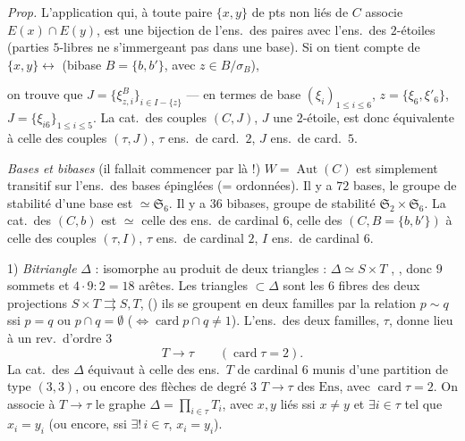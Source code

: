 \documentclass[11pt,a4paper]{article}
\begin{document}
\emph{Prop.} L'application qui, à toute paire $\lbrace x,y\rbrace$ de pts non liés de $C$ associe $E(x)\cap E(y)$, est une bijection de l'ens.\ des paires avec l'ens.\ des $2$-étoiles (parties $5$-libres ne s'immergeant pas dans une base). Si on tient compte de $\lbrace x,y\rbrace\leftrightarrow$ (bibase $B=\lbrace b,b'\rbrace$, avec $z\in B/\sigma_B$),

on trouve que $J=\lbrace\xi^B_{z,i}\rbrace_{i\in I-\lbrace z\rbrace}$ --- en termes de base $(\xi_i)_{1\leq i\leq6}$, $z=\lbrace\xi_6,\xi'_6\rbrace$, $J=\lbrace\xi_{i6}\rbrace_{1\leq i\leq5}$. La cat.\ des \struck{\ill{}} couples $(C,J)$, $J$ une $2$-étoile, est donc équivalente à celle des couples $(\tau,J)$, $\tau$ ens.\ de card.\ $2$, $J$ ens.\ de card.\ $5$.

\emph{Bases et bibases} (il fallait commencer par là !) $W=\operatorname{Aut}(C)$ est simplement transitif sur l'ens.\ des bases épinglées (= ordonnées). Il y a $72$ bases, le groupe de stabilité d'une base est $\simeq\mathfrak{S}_6$. Il y a $36$ bibases, groupe de stabilité $\mathfrak{S}_2\times\mathfrak{S}_6$. La cat.\ des $(C,b)$ est $\simeq$ celle des ens.\ de cardinal $6$, celle des $(C,B=\lbrace b,b'\rbrace)$ à celle des couples $(\tau,I)$, $\tau$ ens.\ de cardinal $2$, $I$ ens.\ de cardinal $6$.

1) \emph{Bitriangle} $\Delta$ :  isomorphe au  produit de deux triangles : $\Delta\simeq S\times T$ , , donc $9$ sommets et $4\cdot9:2=18$ arêtes. Les triangles $\subset\Delta$ sont les $6$ fibres des deux projections $S\times T\rightrightarrows S,T$, (\add{\ill{}}) ils se groupent en deux familles par la relation $p\sim q$ ssi $p=q$ ou $p\cap q=\emptyset$ ($\Longleftrightarrow\operatorname{card}p\cap q\neq1$). L'ens.\ des deux familles, $\tau$, donne lieu à un rev.\ d'ordre $3$
\[
T\longrightarrow\tau\qquad(\operatorname{card}\tau=2).
\]
La cat.\ des $\Delta$ équivaut à celle des ens.\ $T$ de cardinal $6$ munis d'une partition de type $(3,3)$, ou encore des flèches de degré $3$ $T\to\tau$ des $\mathrm{Ens}$, avec $\operatorname{card}\tau=2$. On associe à $T\to\tau$ le graphe $\Delta=\prod_{i\in\tau}T_i$, avec  $x,y$ \add{($\in\Delta$)} liés ssi $x\neq y$ et \struck{\ill{}} $\exists i\in\tau$ tel que $x_i=y_i$ (ou encore, ssi $\exists!\,i\in\tau$, $x_i=y_i$).
\end{document}
